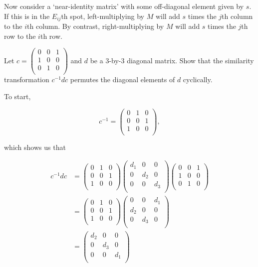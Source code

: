 \documentclass[../group-theory-in-a-nutshell-for-physicists.tex]{subfiles}
\begin{document}
\begin{questions}
\begin{solution}
Now consider a `near-identity matrix' with some off-diagonal element given by $s$. If this is in the $E_{ij}$th spot, left-multiplying by $M$ will add $s$ times the $j$th column to the
$i$th column. By contrast, right-multiplying by $M$ will add $s$
times the $j$th row to the $i$th row.
\end{solution}

\question Let $c = \begin{pmatrix}
0 & 0 & 1 \\
1 & 0 & 0 \\
0 & 1 & 0 \\
\end{pmatrix}$ and $d$ be a $3$-by-$3$ diagonal matrix. Show that the
similarity transformation $c^{- 1}dc$ permutes the diagonal elements
of $d$ cyclically.

\begin{solution}
To start,

\[
c^{- 1} = \begin{pmatrix}
0 & 1 & 0 \\
0 & 0 & 1 \\
1 & 0 & 0 \\
\end{pmatrix},
\]

which shows us that

\begin{align*}
c^{- 1}dc &= \begin{pmatrix}
0 & 1 & 0 \\
0 & 0 & 1 \\
1 & 0 & 0 \\
\end{pmatrix}\begin{pmatrix}
d_{1} & 0 & 0 \\
0 & d_{2} & 0 \\
0 & 0 & d_{3} \\
\end{pmatrix}\begin{pmatrix}
0 & 0 & 1 \\
1 & 0 & 0 \\
0 & 1 & 0 \\
\end{pmatrix} \\
&= \begin{pmatrix}
0 & 1 & 0 \\
0 & 0 & 1 \\
1 & 0 & 0 \\
\end{pmatrix}\begin{pmatrix}
0 & 0 & d_{1} \\
d_{2} & 0 & 0 \\
0 & d_{3} & 0 \\
\end{pmatrix} \\
&= \begin{pmatrix}
d_{2} & 0 & 0 \\
0 & d_{3} & 0 \\
0 & 0 & d_{1} \\
\end{pmatrix}
\end{align*}


\end{solution}
\end{questions}
\end{document}
